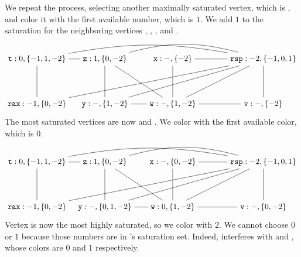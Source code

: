 \documentclass[11pt]{book}
\begin{document}
We repeat the process, selecting another maximally saturated
vertex, which is , and color it with the first available
number, which is $1$. We add $1$ to the saturation for the
neighboring vertices , , , and .
\[
\begin{tikzpicture}[baseline=(current  bounding  box.center)]
\node (rax) at (0,0) {$\ttm{rax}:-1,\{0,-2\}$};
\node (rsp) at (10,2) {$\ttm{rsp}:-2,\{-1,0,1\}$};
\node (t1) at (0,2) {$\ttm{t}:0,\{-1,1,-2\}$};
\node (z) at (3,2)  {$\ttm{z}:1,\{0,-2\}$};
\node (x) at (6,2)  {$\ttm{x}:-,\{-2\}$};
\node (y) at (3,0)  {$\ttm{y}:-,\{1,-2\}$};
\node (w) at (6,0)  {$\ttm{w}:-,\{1,-2\}$};
\node (v) at (10,0)  {$\ttm{v}:-,\{-2\}$};

\draw (t1) to (rax);
\draw (t1) to (z);
\draw (z) to (y);
\draw (z) to (w);
\draw (x) to (w);
\draw (y) to (w);
\draw (v) to (w);

\draw (v) to (rsp);
\draw (w) to (rsp);
\draw (x) to (rsp);
\draw (y) to (rsp);
\path[-.,bend left=15] (z) edge node {} (rsp);
\path[-.,bend left=10] (t1) edge node {} (rsp);
\draw (rax) to (rsp);
\end{tikzpicture}
\]
The most saturated vertices are now  and . We color
 with the first available color, which is $0$.
\[
\begin{tikzpicture}[baseline=(current  bounding  box.center)]
\node (rax) at (0,0) {$\ttm{rax}:-1,\{0,-2\}$};
\node (rsp) at (10,2) {$\ttm{rsp}:-2,\{-1,0,1\}$};
\node (t1) at (0,2) {$\ttm{t}:0,\{-1,1,-2\}$};
\node (z) at (3,2)  {$\ttm{z}:1,\{0,-2\}$};
\node (x) at (6,2)  {$\ttm{x}:-,\{0,-2\}$};
\node (y) at (3,0)  {$\ttm{y}:-,\{0,1,-2\}$};
\node (w) at (6,0)  {$\ttm{w}:0,\{1,-2\}$};
\node (v) at (10,0)  {$\ttm{v}:-,\{0,-2\}$};

\draw (t1) to (rax);
\draw (t1) to (z);
\draw (z) to (y);
\draw (z) to (w);
\draw (x) to (w);
\draw (y) to (w);
\draw (v) to (w);

\draw (v) to (rsp);
\draw (w) to (rsp);
\draw (x) to (rsp);
\draw (y) to (rsp);
\path[-.,bend left=15] (z) edge node {} (rsp);
\path[-.,bend left=10] (t1) edge node {} (rsp);
\draw (rax) to (rsp);
\end{tikzpicture}
\]
Vertex  is now the most highly saturated, so we color 
with $2$.  We cannot choose $0$ or $1$ because those numbers are in
's saturation set. Indeed,  interferes with 
and , whose colors are $0$ and $1$ respectively.
\end{document}

